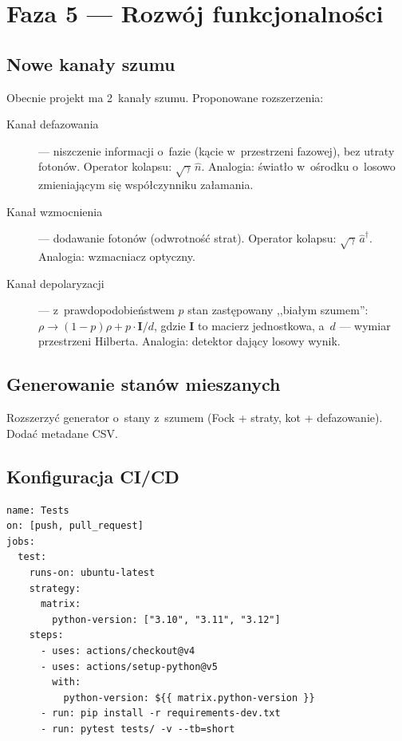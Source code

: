 \documentclass[12pt,a4paper]{article}
\begin{document}
\section{Faza 5 --- Rozwój funkcjonalności}
\label{sec:faza5}

\subsection{Nowe kanały szumu}

Obecnie projekt ma 2~kanały szumu. Proponowane rozszerzenia:

\begin{description}
    \item[Kanał defazowania] --- niszczenie informacji o~fazie (kącie w~przestrzeni fazowej), bez utraty fotonów. Operator kolapsu: $\sqrt{\gamma}\,\hat{n}$. Analogia: światło w~ośrodku o~losowo zmieniającym się współczynniku załamania.
    \item[Kanał wzmocnienia] --- dodawanie fotonów (odwrotność strat). Operator kolapsu: $\sqrt{\gamma}\,\hat{a}^\dagger$. Analogia: wzmacniacz optyczny.
    \item[Kanał depolaryzacji] --- z~prawdopodobieństwem $p$ stan zastępowany ,,białym szumem'': $\rho \to (1-p)\rho + p\cdot \mathbf{I}/d$, gdzie $\mathbf{I}$ to macierz jednostkowa, a~$d$ --- wymiar przestrzeni Hilberta. Analogia: detektor dający losowy wynik.
\end{description}

\subsection{Generowanie stanów mieszanych}

Rozszerzyć generator o~stany z~szumem (Fock + straty, kot + defazowanie). Dodać metadane CSV.

\subsection{Konfiguracja CI/CD}

\begin{lstlisting}[style=yaml, caption={Proponowany \texttt{.github/workflows/tests.yml}.}, label={lst:ci}]
name: Tests
on: [push, pull_request]
jobs:
  test:
    runs-on: ubuntu-latest
    strategy:
      matrix:
        python-version: ["3.10", "3.11", "3.12"]
    steps:
      - uses: actions/checkout@v4
      - uses: actions/setup-python@v5
        with:
          python-version: ${{ matrix.python-version }}
      - run: pip install -r requirements-dev.txt
      - run: pytest tests/ -v --tb=short
\end{lstlisting}
\end{document}
